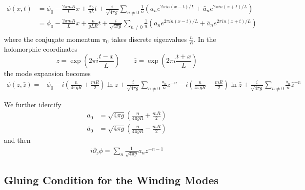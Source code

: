 \begin{widetext}
\begin{equation}
\begin{aligned}
\phi( x, t ) &= \phi_0 - \frac{2\pi m R}{L}x + \frac{\pi_0}{gL} t  + \frac{i}{\sqrt{4 \pi g}}\sum_{n\neq0}\frac{1}{n}(a_ne^{2\pi i n(x-t)/L}+ \bar{a}_{n} e^{2\pi i n(x+t)/L})\\  
&= \phi_0 - \frac{2\pi m R}{L}x + \frac{n}{gLR} t  +  \frac{i}{\sqrt{4 \pi g}}\sum_{n\neq0}\frac{1}{n}(a_ne^{2\pi i n(x-t)/L}+ \bar{a}_{n} e^{2\pi i n(x+t)/L})\\ 
\end{aligned}
\end{equation}
where the conjugate momentum $\pi_0$ takes discrete eigenvalues $\frac{n}{R}$. In the holomorphic coordinates
\begin{equation}
\label{eq:zzbar}
z = \exp( 2 \pi i \frac{t - x}{L}) \qquad \bar{z} = \exp( 2 \pi i \frac{t + x}{L})
\end{equation}
the mode expansion becomes
\begin{equation}
\label{eq:boson-mode-exp}
\begin{aligned}
\phi( z, \bar{z}) = &\phi_0 -i \left( \frac{n}{4\pi g  R} + \frac{m R }{2} \right)  \ln z + \frac{i}{\sqrt{4\pi g}} \sum_{n\ne 0 } \frac{a_n}{n} z^{-n } -i \left( \frac{n}{4\pi g R} - \frac{m R }{2} \right)  \ln \bar{z} + \frac{i}{\sqrt{4\pi g}} \sum_{n\ne 0 } \frac{\bar{a}_n}{n} \bar{z}^{-n } 
\end{aligned}
\end{equation}
\end{widetext}
We further identify 
\begin{equation}
\begin{aligned}
  a_0 &= \sqrt{ 4 \pi g } \left( \frac{n}{4\pi g R} + \frac{m R }{2} \right) \\
   \bar{a}_0 &= \sqrt{ 4 \pi g } \left( \frac{n}{4\pi g R} - \frac{m R }{2} \right)
  \end{aligned}
\end{equation}
and then 
\begin{equation}
\begin{aligned}
i \partial_z \phi =  \sum_n \frac{1}{\sqrt{4\pi g}} a_n z^{-n-1} 
\end{aligned}
\end{equation}

\subsection{Gluing Condition for the Winding Modes}
\label{app_sub:compact_gluing_boundary}

